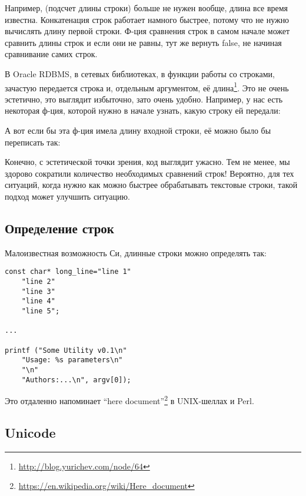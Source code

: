 Например,  (подсчет длины строки) больше не нужен вообще, длина все время известна.
Конкатенация строк работает намного быстрее, потому что не нужно вычислять длину первой строки.
Ф-ция сравнения строк в самом начале может сравнить длины строк и если они не равны, тут же вернуть false,
не начиная сравнивание самих строк.

В Oracle RDBMS, в сетевых библиотеках, в функции работы со строками, зачастую передается строка и, 
отдельным аргументом, её длина\footnote{\url{http://blog.yurichev.com/node/64}}.
Это не очень эстетично, это выглядит избыточно, зато очень удобно.
Например, у нас есть некоторая ф-ция, которой нужно в начале узнать, какую строку ей передали:



А вот если бы эта ф-ция имела длину входной строки, её можно было бы переписать так:



Конечно, с эстетической точки зрения, код выглядит ужасно.
Тем не менее, мы здорово сократили количество необходимых сравнений строк! Вероятно, для тех ситуаций, когда 
нужно как можно быстрее обрабатывать текстовые строки, такой подход может улучшить ситуацию.



\subsection{Определение строк}

\label{heredoc}
Малоизвестная возможность Си, длинные строки можно определять так:

\begin{lstlisting}
const char* long_line="line 1"
	"line 2"
	"line 3"
	"line 4"
	"line 5";

...

printf ("Some Utility v0.1\n"
	"Usage: %s parameters\n"
	"\n"
	"Authors:...\n", argv[0]);
\end{lstlisting}

Это отдаленно напоминает ``here document''\footnote{\url{https://en.wikipedia.org/wiki/Here_document}} в 
UNIX-шеллах и Perl.



\subsection{Unicode}

